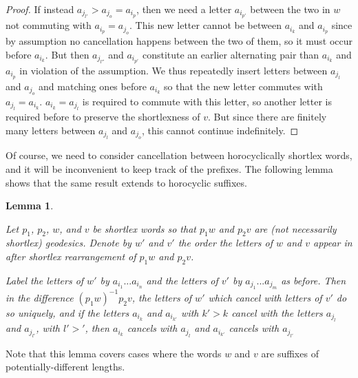 \documentclass{amsart}
\newtheorem{lemma}[theorem]{Lemma}
\theoremstyle{definition}
\theoremstyle{remark}
\begin{document}
\begin{proof}
		If instead $a_{j_{l'}}>a_{j_o}=a_{i_p}$, then we need a letter $a_{i_{p'}}$ between the two in $w$ not commuting with $a_{i_{p}}=a_{j_o}$. This new letter cannot be between $a_{i_k}$ and $a_{i_{p}}$ since by assumption no cancellation happens between the two of them, so it must occur before $a_{i_k}$. But then $a_{j_{l''}}$ and $a_{i_{p'}}$ constitute an earlier alternating pair than $a_{i_k}$ and $a_{i_{p}}$ in violation of the assumption. We thus repeatedly insert  letters between $a_{j_l}$ and $a_{j_{o}}$ and matching ones before $a_{i_k}$ so that the new letter commutes with $a_{j_l}=a_{i_{k}}$. $a_{i_{k}}=a_{j_l}$ is required to commute with this letter, so another letter is required before to preserve the shortlexness of $v$. But since there are finitely many letters between $a_{j_l}$ and $a_{j_{o}}$, this cannot continue indefinitely.
	\end{proof}
	
	Of course, we need to consider cancellation between horocyclically shortlex words, and it will be inconvenient to keep track of the prefixes. The following lemma shows that the same result extends to horocyclic suffixes. 
	
	\begin{lemma} \label{HorocyclicNonLinking}
		
		Let $p_1$, $p_2$, $w$, and $v$ be shortlex words so that $p_1w$ and $p_2v$ are (not necessarily shortlex) geodesics. Denote by $w'$ and $v'$ the order the letters of $w$ and $v$ appear in after shortlex rearrangement of $p_1w$ and $p_2v$. 
		
		Label the letters of $w'$ by $a_{i_1}...a_{i_n}$ and the letters of $v'$ by $a_{j_1}...a_{j_m}$ as before. Then in the difference $(p_1w)^{-1}p_2v$, the letters of $w'$ which cancel with letters of $v'$ do so uniquely, and if the letters $a_{i_k}$ and $a_{i_{k'}}$ with $k'>k$ cancel with the letters $a_{j_l}$ and $a_{j_{l'}}$, with $l'>'$, then $a_{i_k}$ cancels with $a_{j_l}$ and $a_{i_{k'}}$ cancels with $a_{j_{l'}}$
		
	\end{lemma}
	
	Note that this lemma covers cases where the words $w$ and $v$ are suffixes of potentially-different lengths.
	
\end{document}
